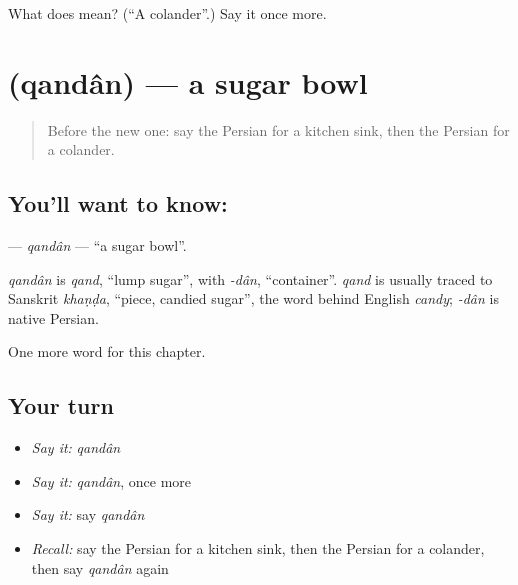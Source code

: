 \begin{tcolorbox}[breakable,colback=teal!4,colframe=teal!35!black,title={Before you move on}]
What does  mean? (\textquotedblleft{}A colander\textquotedblright{}.) Say it once more.
\end{tcolorbox}
\section[\texorpdfstring{\fa{قندان} (qandân)}{قندان (qandân)}]{ (qandân) — a sugar bowl}

\label{lesson:FA-C174-qandan}



\begin{quote}
Before the new one: say the Persian for a kitchen sink, then the Persian for a colander.
\end{quote}

\subsection*{You'll want to know: }
\textbf{} — \emph{qandân} — \textquotedblleft{}a sugar bowl\textquotedblright{}.

\begin{cousinweb}
\emph{qandân} is \emph{qand}, \textquotedblleft{}lump sugar\textquotedblright{}, with \emph{-dân}, \textquotedblleft{}container\textquotedblright{}. \emph{qand} is usually traced to Sanskrit \emph{khaṇḍa}, \textquotedblleft{}piece, candied sugar\textquotedblright{}, the word behind English \emph{candy}; \emph{-dân} is native Persian.
\end{cousinweb}

\begin{grammarlens}[title={What you've built}]
One more word for this chapter.
\end{grammarlens}

\subsection*{Your turn}
\begin{itemize}
\raggedright
  \item \emph{Say it:} \emph{qandân}
  \item \emph{Say it:} \emph{qandân}, once more
  \item \emph{Say it:} say \emph{qandân}
  \item \emph{Recall:} say the Persian for a kitchen sink, then the Persian for a colander, then say \emph{qandân} again
\end{itemize}

